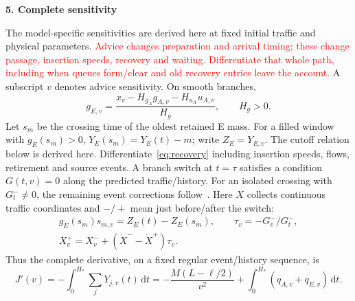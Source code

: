 \documentclass[10pt,a4paper]{article}
\newcommand{\dd}{\,\mathrm d}
\newcommand{\head}[1]{\par\vspace{4pt}\noindent\textbf{#1}\par\nobreak\vspace{1pt}}
\newcommand{\rev}[1]{\textcolor{red}{#1}}
\begin{document}
\newpage
\head{5. Complete sensitivity}
The model-specific sensitivities are derived here at fixed initial traffic
and physical parameters.
\rev{Advice changes preparation and arrival timing; these change passage,
insertion speeds, recovery and waiting. Differentiate that whole path,
including when queues form/clear and old recovery entries leave the account.}
A subscript $v$ denotes advice sensitivity. On smooth branches,
\begin{equation}
 g_{E,v}=\frac{x_v-H_{g_A}g_{A,v}-H_{u_A}u_{A,v}}{H_g},\qquad H_g>0.
 \label{eq:rootgradient}
\end{equation}
\begingroup\color{red}
Let $s_m$ be the crossing time of the oldest retained E mass. For a filled
window with $g_E(s_m)>0$, $Y_E(s_m)=Y_E(t)-m$; write $Z_E=Y_{E,v}$.
The cutoff relation below is derived here. Differentiate~\eqref{eq:recovery}
including insertion speeds, flows, retirement and source events. A branch
switch at $t=\tau$ satisfies a condition $G(t,v)=0$ along the predicted
traffic/history. For an isolated crossing with $G_t^-\ne0$, the remaining
event corrections follow~\cite{kong}. Here $X$ collects continuous traffic
coordinates and $-/+$ mean just before/after the switch:
\endgroup
\begin{equation}
 \begin{gathered}
 g_E(s_m)s_{m,v}=Z_E(t)-Z_E(s_m),\qquad \tau_v=-G_v^-/G_t^-,\\
 X_v^+=X_v^-+(\dot X^- -\dot X^+)\tau_v.
 \end{gathered}
 \label{eq:eventgradient}
\end{equation}
Thus the complete derivative, on a fixed regular event/history sequence, is
\begin{equation}
 J'(v)=-\int_0^{H_*}\!\sum_jY_{j,v}(t)\dd t
 =-\frac{M(L-\ell/2)}{v^2}+\int_0^{H_*}(q_{A,v}+q_{E,v})\dd t.
 \label{eq:objectivegradient}
\end{equation}
\makeatletter
\renewcommand{\section}{\@ifstar{\head}{\head}}
\makeatother
\end{document}
